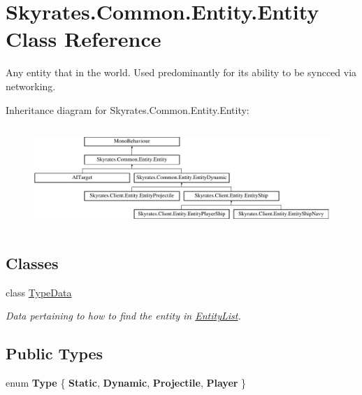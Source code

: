 \hypertarget{class_skyrates_1_1_common_1_1_entity_1_1_entity}{\section{Skyrates.\-Common.\-Entity.\-Entity Class Reference}
\label{class_skyrates_1_1_common_1_1_entity_1_1_entity}
}


Any entity that in the world. Used predominantly for its ability to be syncced via networking.  


Inheritance diagram for Skyrates.\-Common.\-Entity.\-Entity\-:\begin{figure}[H]
\begin{center}
\leavevmode
\includegraphics[height=3.888889cm]{class_skyrates_1_1_common_1_1_entity_1_1_entity}
\end{center}
\end{figure}
\subsection*{Classes}
\begin{DoxyCompactItemize}
\item 
class \hyperlink{class_skyrates_1_1_common_1_1_entity_1_1_entity_1_1_type_data}{Type\-Data}
\begin{DoxyCompactList}\small\item\em Data pertaining to how to find the entity in \hyperlink{class_skyrates_1_1_common_1_1_entity_1_1_entity_list}{Entity\-List}. \end{DoxyCompactList}\end{DoxyCompactItemize}
\subsection*{Public Types}
\begin{DoxyCompactItemize}
\item 
enum {\bfseries Type} \{ {\bfseries Static}, 
{\bfseries Dynamic}, 
{\bfseries Projectile}, 
{\bfseries Player}
 \}
\end{DoxyCompactItemize}
